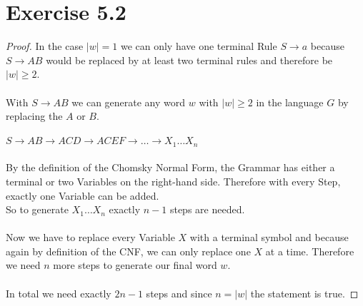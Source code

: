 \documentclass{article} %
\newcommand{\homeworkNumber}{5}
\begin{document}
\section*{Exercise \homeworkNumber.2}
\begin{proof}
In the case $\vert w \vert = 1$ we can only have one terminal Rule $ S \to a $ because $ S \to AB $ would be replaced by at least two terminal rules and therefore be $\vert w \vert \geq 2$. \\\\
With $ S \to AB $ we can generate any word $w$ with $\vert w \vert \geq 2$ in the language $G$ by replacing the $A$ or $B$.\\\\
$S \to AB \to ACD \to ACEF \to \ldots \to X_1 \ldots X_n$\\\\
By the definition of the Chomsky Normal Form, the Grammar has either a terminal or two Variables on the right-hand side. Therefore with every Step, exactly one Variable can be added.\\
So to generate $X_1 \ldots X_n$ exactly $n-1$ steps are needed.\\\\
Now we have to replace every Variable $X$ with a terminal symbol and because again by definition of the CNF, we can only replace one $X$ at a time. Therefore we need $n$ more steps to generate our final word $w$.\\\\
In total we need exactly $2n-1$ steps and since $n = \vert w \vert$ the statement is true.
\end{proof}
\end{document}
